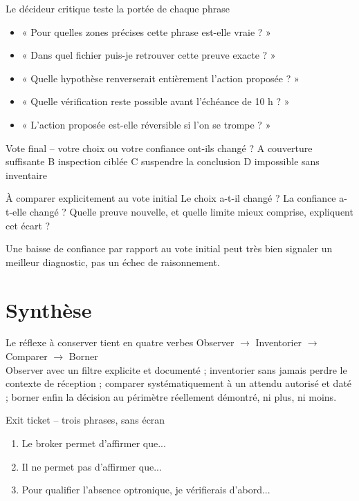 \documentclass[aspectratio=169]{beamer}
\begin{document}
\begin{frame}{Le décideur critique teste la portée de chaque phrase}
\begin{itemize}
\item « Pour quelles zones précises cette phrase est-elle vraie ? »
\item « Dans quel fichier puis-je retrouver cette preuve exacte ? »
\item « Quelle hypothèse renverserait entièrement l'action proposée ? »
\item « Quelle vérification reste possible avant l'échéance de 10 h ? »
\item « L'action proposée est-elle réversible si l'on se trompe ? »
\end{itemize}
\end{frame}

\begin{frame}{Vote final -- votre choix ou votre confiance ont-ils changé ?}
A couverture suffisante \quad B inspection ciblée \quad C suspendre la conclusion \quad D impossible sans inventaire
\begin{block}{À comparer explicitement au vote initial}
Le choix a-t-il changé ? La confiance a-t-elle changé ? Quelle preuve nouvelle, et quelle limite mieux comprise, expliquent cet écart ?
\end{block}
Une baisse de confiance par rapport au vote initial peut très bien signaler un meilleur diagnostic, pas un échec de raisonnement.
\end{frame}

\section{Synthèse}
\begin{frame}{Le réflexe à conserver tient en quatre verbes}
\centering\Large Observer $\rightarrow$ Inventorier $\rightarrow$ Comparer $\rightarrow$ Borner\\[1em]
\normalsize Observer avec un filtre explicite et documenté ; inventorier sans jamais perdre le contexte de réception ; comparer systématiquement à un attendu autorisé et daté ; borner enfin la décision au périmètre réellement démontré, ni plus, ni moins.
\end{frame}

\begin{frame}{Exit ticket -- trois phrases, sans écran}
\begin{enumerate}
\item Le broker permet d'affirmer que...
\item Il ne permet pas d'affirmer que...
\item Pour qualifier l'absence optronique, je vérifierais d'abord...
\end{enumerate}
\end{frame}
\end{document}
